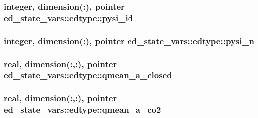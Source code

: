 \subsubsection[{\texorpdfstring{pysi\+\_\+id}{pysi_id}}]{\setlength{\rightskip}{0pt plus 5cm}integer, dimension(\+:), pointer ed\+\_\+state\+\_\+vars\+::edtype\+::pysi\+\_\+id}\hypertarget{structed__state__vars_1_1edtype_a856ffa320fb106490bec6f6664ebb881}{}\label{structed__state__vars_1_1edtype_a856ffa320fb106490bec6f6664ebb881}
\subsubsection[{\texorpdfstring{pysi\+\_\+n}{pysi_n}}]{\setlength{\rightskip}{0pt plus 5cm}integer, dimension(\+:), pointer ed\+\_\+state\+\_\+vars\+::edtype\+::pysi\+\_\+n}\hypertarget{structed__state__vars_1_1edtype_a2edd5f07c84dea74d1677b4ed8021e99}{}\label{structed__state__vars_1_1edtype_a2edd5f07c84dea74d1677b4ed8021e99}
\subsubsection[{\texorpdfstring{qmean\+\_\+a\+\_\+closed}{qmean_a_closed}}]{\setlength{\rightskip}{0pt plus 5cm}real, dimension(\+:,\+:), pointer ed\+\_\+state\+\_\+vars\+::edtype\+::qmean\+\_\+a\+\_\+closed}\hypertarget{structed__state__vars_1_1edtype_a3f21af325ccd0f7d160f1a570b7e9df7}{}\label{structed__state__vars_1_1edtype_a3f21af325ccd0f7d160f1a570b7e9df7}
\subsubsection[{\texorpdfstring{qmean\+\_\+a\+\_\+co2}{qmean_a_co2}}]{\setlength{\rightskip}{0pt plus 5cm}real, dimension(\+:,\+:), pointer ed\+\_\+state\+\_\+vars\+::edtype\+::qmean\+\_\+a\+\_\+co2}\hypertarget{structed__state__vars_1_1edtype_a06e6cc8bd55be5ea57271ae3b661b743}{}\label{structed__state__vars_1_1edtype_a06e6cc8bd55be5ea57271ae3b661b743}
